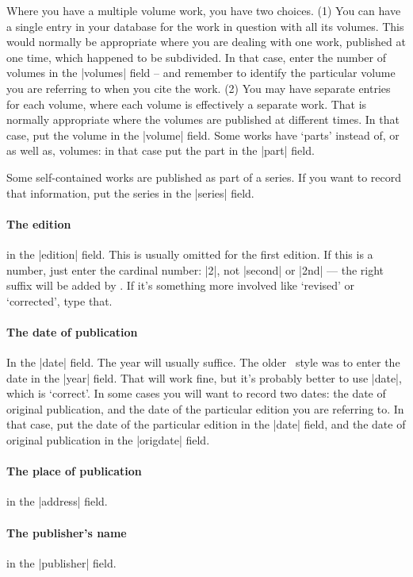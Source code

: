 {Where you have a multiple volume work, you have two choices. (1) You can have a single entry in your database for the work in question with all its volumes. This would normally be appropriate where you are dealing with one work, published at one time, which happened to be subdivided. In that case, enter the number of volumes in the |volumes| field -- and remember to identify the particular volume you are referring to when you cite the work. (2) You may have separate entries for each volume, where each volume is effectively a separate work. That is normally appropriate where the volumes are published at different times. In that case, put the volume in the |volume| field. Some works have `parts' instead of, or as well as, volumes: in that case put the part in the |part| field.

Some self-contained works are published as part of a series. If you want to record that information, put the series in the |series| field.

\paragraph{The edition} in the |edition| field. This is usually omitted for the first edition. If this is a number, just enter the cardinal number: |{2}|, not |second| or |2nd| --- the right suffix will be added by \biblatex. If it's something more involved like `revised' or `corrected', type that.

\paragraph{The date of publication} In the |date| field. The year will usually suffice. The older \bibtex\ style was to enter the date in the |year| field. That will work fine, but it's probably better to use |date|, which is `correct'. In some cases you will want to record two dates: the date of original publication, and the date of the particular edition you are referring to. In that case, put the date of the particular edition in the |date| field, and the date of original publication in the |origdate| field.

\paragraph{The place of publication} in the |address| field.

\paragraph{The publisher's name} in the |publisher| field.

}
